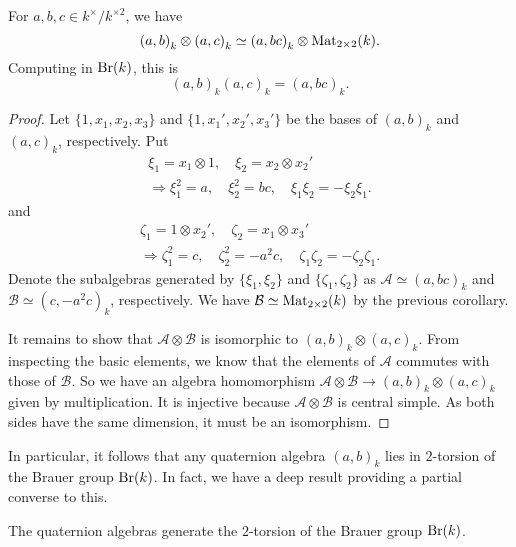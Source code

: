 \documentclass{article}
\newcommand{\qa}[2]{\left(#1\right)_{#2}}
\begin{document}
\begin{proposition}
    For $a,b,c\in k^\times/k^{\times 2}$, we have
    \begin{equation*}
        \qa{a,b}{k}\otimes\qa{a,c}{k}\simeq \qa{a,bc}{k}\otimes\Mat{2\times 2}(k).
    \end{equation*}
    Computing in $\operatorname{Br}(k)$, this is
    \begin{equation*}
        \qa{a,b}{k}\qa{a,c}{k}=\qa{a,bc}{k}.
    \end{equation*}
\end{proposition}

\begin{proof}
    Let $\{1,x_1,x_2,x_3\}$ and $\{1,x_1',x_2',x_3'\}$ be the bases of $\qa{a,b}{k}$ and $\qa{a,c}{k}$, respectively.
    Put
    \begin{gather*}
        \xi_1=x_1\otimes 1, \quad \xi_2=x_2\otimes x_2' \\
        \Longrightarrow \xi_1^2=a, \quad \xi_2^2=bc, \quad \xi_1\xi_2=-\xi_2\xi_1.
    \end{gather*}
    and
    \begin{gather*}
        \zeta_1=1\otimes x_2', \quad \zeta_2=x_1\otimes x_3' \\
        \Longrightarrow \zeta_1^2=c, \quad \zeta_2^2=-a^2c, \quad \zeta_1\zeta_2=-\zeta_2\zeta_1.
    \end{gather*}
    Denote the subalgebras generated by $\{\xi_1,\xi_2\}$ and $\{\zeta_1,\zeta_2\}$ as $\mathcal{A}\simeq\qa{a,bc}{k}$ and $\mathcal{B}\simeq\qa{c,-a^2c}{k}$, respectively. We have $\mathcal{B}\simeq\operatorname{Mat}_{2\times 2}(k)$ by the previous corollary.

    It remains to show that $\mathcal{A}\otimes\mathcal{B}$ is isomorphic to $\qa{a,b}{k} \otimes \qa{a,c}{k}$. From inspecting the basic elements, we know that the elements of $\mathcal{A}$ commutes with those of $\mathcal{B}$. So we have an algebra homomorphism $\mathcal{A}\otimes\mathcal{B} \to \qa{a,b}{k} \otimes \qa{a,c}{k}$ given by multiplication. It is injective because $\mathcal{A}\otimes\mathcal{B}$ is central simple. As both sides have the same dimension, it must be an isomorphism.
\end{proof}

In particular, it follows that any quaternion algebra $\qa{a,b}{k}$ lies in $2$-torsion of the Brauer group $\operatorname{Br}(k)$.
In fact, we have a deep result providing a partial converse to this.

\begin{theorem}[Merkurje]
    The quaternion algebras generate the $2$-torsion of the Brauer group $\operatorname{Br}(k)$.
\end{theorem}
\end{document}
